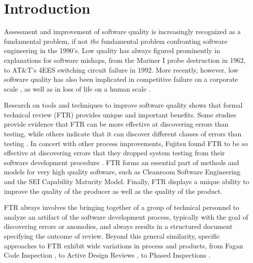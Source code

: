 
\section{Introduction}

Assessment and improvement of software quality is increasingly recognized
as a fundamental problem, if not {\em the}\/ fundamental problem
confronting software engineering in the 1990's.  Low quality has always
figured prominently in explanations for software mishaps, from the Mariner
I probe destruction in 1962, to AT\&T's 4EES switching circuit failure in
1992.  More recently, however, low software quality has also been
implicated in competitive failure on a corporate scale \cite{Arthur93}, as
well as in loss of life on a human scale \cite{Leveson93}.

Research on tools and techniques to improve software quality shows
that formal technical review (FTR) provides unique and important
benefits.  Some studies provide evidence that FTR can be more
effective at discovering errors than testing, while others indicate
that it can discover different classes of errors than testing
\cite{Myers78,Basili86}.  In concert with other process improvements,
Fujitsu found FTR to be so effective at discovering errors that they
dropped system testing from their software development procedure
\cite{Arthur93}.  FTR forms an essential part of methods and models
for very high quality software, such as Cleanroom Software Engineering
and the SEI Capability Maturity Model.
Finally, FTR displays a unique ability to improve the quality of the 
producer as well as the quality of the product.


FTR always involves the bringing together of a group of technical personnel
to analyze an artifact of the software development process, typically with
the goal of discovering errors or anomolies, and always results in a
structured document specifying the outcome of review.  Beyond this general
similarity, specific approaches to FTR exhibit wide variations in process
and products, from Fagan Code Inspection \cite{Fagan76}, to Active
Design Reviews \cite{Parnas85}, to Phased Inspections \cite{Knight91}.

